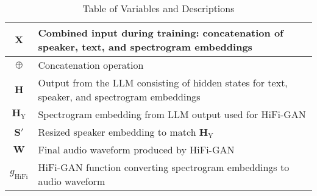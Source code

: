 \begin{table}[H]
\begin{tabular}{c|l}
        \( \mathbf{X} \) & Combined input during training: concatenation of speaker, text, and spectrogram embeddings \\ \hline
        \( \oplus \) & Concatenation operation \\ \hline
        \( \mathbf{H} \) & Output from the LLM consisting of hidden states for text, speaker, and spectrogram embeddings \\ \hline
        \( \mathbf{H}_\text{Y} \) & Spectrogram embedding from LLM output used for HiFi-GAN \\ \hline
        \( \mathbf{S}' \) & Resized speaker embedding to match \( \mathbf{H}_\text{Y} \) \\ \hline
        \( \mathbf{W} \) & Final audio waveform produced by HiFi-GAN \\ \hline
        \( g_\text{HiFi} \) & HiFi-GAN function converting spectrogram embeddings to audio waveform \\ \hline
    \end{tabular}
    \label{tab:variables_descriptions}
    \caption{Table of Variables and Descriptions}
\end{table}







